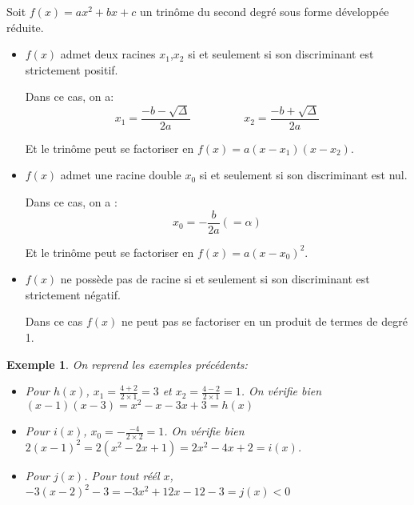 \documentclass[a4paper,11pt]{article}
\theoremstyle{break}
\newtheorem{Ex}{Exemple}
\begin{document}
  \begin{Theo}[Central]
    Soit $f(x)=ax^2+bx+c$ un trinôme du second degré sous forme développée réduite.
    \begin{itemize}
     \item  $f(x)$ admet deux racines $x_1$,$x_2$ si et seulement si 
     son discriminant est strictement positif.
     
     Dans ce cas, on a:
     $$x_1=\frac{-b-\sqrt{\Delta}}{2a} \hspace{2cm} x_2=\frac{-b+\sqrt{\Delta}}{2a}$$
     
     Et le trinôme peut se factoriser en $f(x)=a(x-x_1)(x-x_2)$.
     
     \item $f(x)$ admet une racine double $x_0$ si et seulement si
     son discriminant est nul.
     
     Dans ce cas, on a :
     $$x_0=-\frac{b}{2a}(=\alpha)$$
     
     Et le trinôme peut se factoriser en $f(x)=a(x-x_0)^2$.
     
     \item $f(x)$ ne possède pas de racine si et seulement si son discriminant
     est strictement négatif.
     
     Dans ce cas $f(x)$ ne peut pas se factoriser en un produit de termes de degré 1.
    \end{itemize}    
  \end{Theo}
  
  \begin{Ex}
    On reprend les exemples précédents:
    \begin{itemize}
     \item Pour $h(x)$, $x_1=\frac{4+2}{2 \times 1}=3$ et $x_2=\frac{4-2}{2 \times 1}=1$.
    On vérifie bien $(x-1)(x-3)=x^2-x-3x+3=h(x)$ 
      
    \item Pour $i(x)$, $x_0=-\frac{-4}{2 \times 2}=1$. On vérifie bien
    $2(x-1)^2=2(x^2-2x+1)=2x^2-4x+2=i(x)$.
     \item Pour $j(x)$. Pour tout réél $x$, $-3(x-2)^2-3=-3x^2+12x-12-3=j(x)<0$
    \end{itemize}
   \end{Ex}
   
\end{document}

